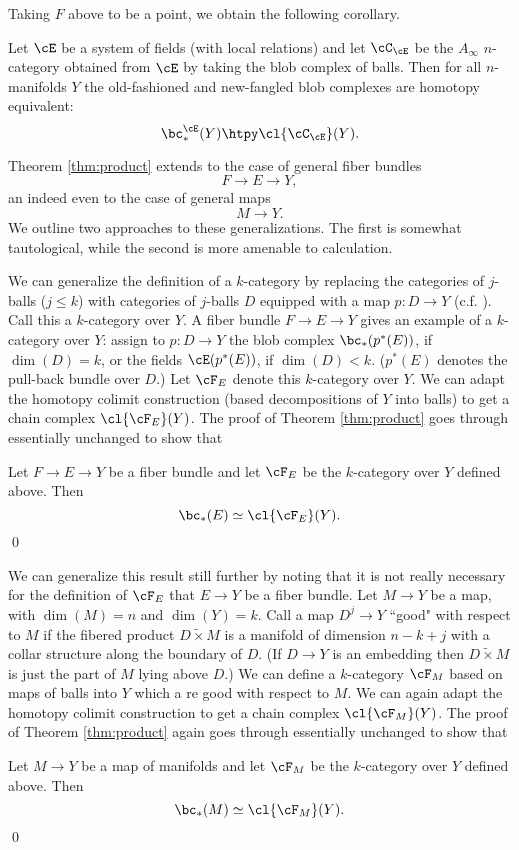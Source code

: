 
\medskip

Taking $F$ above to be a point, we obtain the following corollary.

\begin{cor}
\label{cor:new-old}
Let $\cE$ be a system of fields (with local relations) and let $\cC_\cE$ be the $A_\infty$
$n$-category obtained from $\cE$ by taking the blob complex of balls.
Then for all $n$-manifolds $Y$ the old-fashioned and new-fangled blob complexes are
homotopy equivalent:
\[
	\bc^\cE_*(Y) \htpy \cl{\cC_\cE}(Y) .
\]
\end{cor}

\medskip

Theorem \ref{thm:product} extends to the case of general fiber bundles
\[
	F \to E \to Y ,
\]
an indeed even to the case of general maps
\[
	M\to Y .
\]
We outline two approaches to these generalizations.
The first is somewhat tautological, while the second is more amenable to
calculation.

We can generalize the definition of a $k$-category by replacing the categories
of $j$-balls ($j\le k$) with categories of $j$-balls $D$ equipped with a map $p:D\to Y$
(c.f. \cite{MR2079378}).
Call this a $k$-category over $Y$.
A fiber bundle $F\to E\to Y$ gives an example of a $k$-category over $Y$:
assign to $p:D\to Y$ the blob complex $\bc_*(p^*(E))$, if $\dim(D) = k$,
or the fields $\cE(p^*(E))$, if $\dim(D) < k$.
($p^*(E)$ denotes the pull-back bundle over $D$.)
Let $\cF_E$ denote this $k$-category over $Y$.
We can adapt the homotopy colimit construction (based decompositions of $Y$ into balls) to
get a chain complex $\cl{\cF_E}(Y)$.
The proof of Theorem \ref{thm:product} goes through essentially unchanged 
to show that
\begin{thm}
Let $F \to E \to Y$ be a fiber bundle and let $\cF_E$ be the $k$-category over $Y$ defined above.
Then
\[
	\bc_*(E) \simeq \cl{\cF_E}(Y) .
\]
\qed
\end{thm}

We can generalize this result still further by noting that it is not really necessary
for the definition of $\cF_E$ that $E\to Y$ be a fiber bundle.
Let $M\to Y$ be a map, with $\dim(M) = n$ and $\dim(Y) = k$.
Call a map $D^j\to Y$ ``good" with respect to $M$ if the fibered product
$D\widetilde{\times} M$ is a manifold of dimension $n-k+j$ with a collar structure along the boundary of $D$.
(If $D\to Y$ is an embedding then $D\widetilde{\times} M$ is just the part of $M$
lying above $D$.)
We can define a $k$-category $\cF_M$ based on maps of balls into $Y$ which a re good with respect to $M$.
We can again adapt the homotopy colimit construction to
get a chain complex $\cl{\cF_M}(Y)$.
The proof of Theorem \ref{thm:product} again goes through essentially unchanged 
to show that
\begin{thm}
Let $M \to Y$ be a map of manifolds and let $\cF_M$ be the $k$-category over $Y$ defined above.
Then
\[
	\bc_*(M) \simeq \cl{\cF_M}(Y) .
\]
\qed
\end{thm}


